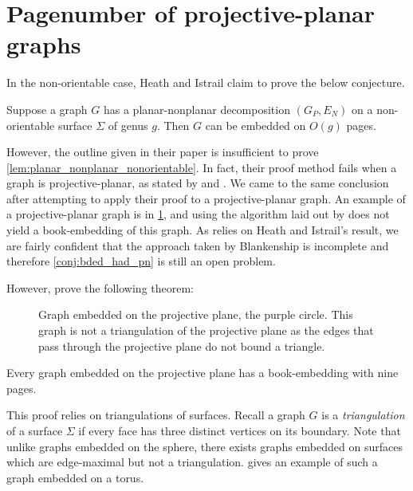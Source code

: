 
\section{Pagenumber of projective-planar graphs}
In the non-orientable case, Heath and Istrail claim to prove the below conjecture.
\begin{conjecture}\label{lem:planar_nonplanar_nonorientable}
	Suppose a graph \(G\) has a planar-nonplanar decomposition \((G_P, E_N)\) on a non-orientable surface \(\Sigma\) of genus $g$. Then \(G\) can be embedded on \( O(g)\) pages.
\end{conjecture}
However, the outline given in their paper is insufficient to prove \cref{lem:planar_nonplanar_nonorientable}. In fact, their proof method fails when a graph is projective-planar, as stated by \textcite{nakamotoBookEmbeddingProjectiveplanar2015} and \textcite{ozekiBookEmbeddingGraphs2019}. We came to the same conclusion after attempting to apply their proof to a projective-planar graph. An example of a projective-planar graph is in \cref{fig:projectiveplanar}, and using the algorithm laid out by \textcite{heathPagenumberGenusGraphs1992} does not yield a book-embedding of this graph. 
As \textcite{Blankenship-PhD03} relies on Heath and Istrail's result, we are fairly confident that the approach taken by Blankenship is incomplete and therefore \cref{conj:bded_had_pn} is still an open problem. 

However, \textcite{nakamotoBookEmbeddingProjectiveplanar2015} prove the following theorem:

\begin{figure}[h]
    \centering
    
    \caption[Projective planar graph]{Graph embedded on the projective plane, the purple circle. This graph is not a triangulation of the projective plane as the edges that pass through the projective plane do not bound a triangle.}\label{fig:projectiveplanar}\end{figure}

\begin{theorem}\label{thm:proj_planar_graphs_9pages}
	Every graph embedded on the projective plane has a book-embedding with nine pages.
\end{theorem}

This proof relies on triangulations of surfaces. Recall a graph $G$ is a \textit{triangulation} of a surface $\Sigma$ if every face has three distinct vertices on its boundary. Note that unlike graphs embedded on the sphere, there exists graphs embedded on surfaces which are edge-maximal but not a triangulation. \textcite{hararyMaximalToroidalGraph1973} gives an example of such a graph embedded on a torus. 

